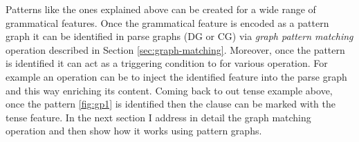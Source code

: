 
%
%


Patterns like the ones explained above can be created for a wide range of grammatical features. Once the grammatical feature is encoded as a pattern graph it can be identified in parse graphs (DG or CG) via \textit{graph pattern matching} operation described in Section \ref{sec:graph-matching}. Moreover, once the pattern is identified it can act as a triggering condition to for various operation. For example an operation can be to inject the identified feature into the parse graph and this way enriching its content. Coming back to out tense example above, once the pattern \ref{fig:gp1} is identified then the clause can be marked with the tense feature. In the next section I address in detail the graph matching operation and then show how it works using pattern graphs. 


